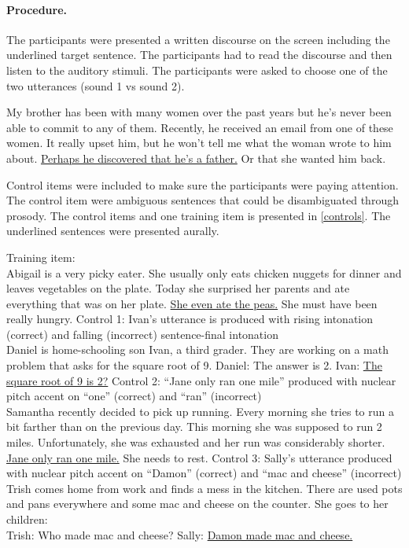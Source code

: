 \documentclass[dina4,12pt,fleqn]{article}
\newcommand{\6}{\mbox{$[\hspace*{-.6mm}[$}}
\newcommand{\9}{\mbox{$]\hspace*{-.6mm}]$}}
\begin{document}
\newpage

\paragraph{Procedure.} The participants were presented a written discourse on the screen including the underlined target sentence. The participants had to read the discourse and then listen to the auditory stimuli. The participants were asked to choose one of the two utterances (sound  1 vs sound 2).

\begin{exe}
\ex My brother has been with many women over the past years but he’s never been able to commit to any of them. Recently, he
received an email from one of these women. It really upset him, but he won’t tell me what the
woman wrote to him about. \underline{Perhaps he discovered that he’s a father.} Or that she wanted him
back.
\end{exe}


Control items were included to make sure the participants were paying attention. The control item were ambiguous sentences that could be disambiguated through prosody. The control items and one training item is presented in \ref{controls}. The underlined sentences were presented aurally.

\begin{exe}
\ex\label{controls}
\begin{xlist}
\ex Training item: \\
Abigail is a very picky eater. She usually only eats chicken nuggets for dinner and leaves vegetables on the plate. Today she surprised her parents and ate everything that was on her plate. \underline{She even ate the peas.} She must have been really hungry.
\ex Control 1: Ivan’s utterance is produced with rising intonation (correct) and falling (incorrect) sentence-final intonation  \\
Daniel is home-schooling son Ivan, a third grader. They are working on a math problem that asks for the square root of 9.
Daniel: The answer is 2.
Ivan: \underline{The square root of 9 is 2?}
\ex Control 2: “Jane only ran one mile” produced with nuclear pitch accent on “one” (correct) and “ran” (incorrect) \\
Samantha recently decided to pick up running. Every morning she tries to run a bit farther than on the previous day. This morning she was supposed to run 2 miles. Unfortunately, she was exhausted and her run was considerably shorter. \underline{Jane only ran one mile.} She needs to rest.
\ex Control 3: Sally’s utterance produced with nuclear pitch accent on “Damon” (correct) and “mac and cheese” (incorrect) \\
Trish comes home from work and finds a mess in the kitchen. There are used pots and pans everywhere and some mac and cheese on the counter. She goes to her children: \\
Trish: Who made mac and cheese?
Sally: \underline{Damon made mac and cheese.}
\end{xlist}
\end{exe}
\end{document}
